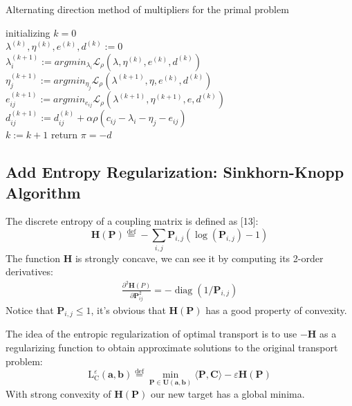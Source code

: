\documentclass{article}
\begin{document}
\begin{large}
\begin{algorithm}[H]
  \SetAlgoNoLine
  \caption{Alternating direction method of multipliers for the primal problem} 
  initializing $k = 0$\\
  $\lambda^{(k)},\eta^{(k)},e^{(k)},d^{(k)}:=0$\\
  {  
   $\lambda^{(k+1)}_{i}:=argmin_{\lambda_{i}}\mathcal{L}_{\rho}(\lambda,\eta^{(k)},e^{(k)},d^{(k)})$\\
   $\eta^{(k+1)}_{j}:=argmin_{\eta_{j}}\mathcal{L}_{\rho}(\lambda^{(k+1)},\eta,e^{(k)},d^{(k)})$\\
   $e^{(k+1)}_{ij}:=argmin_{e_{ij}}\mathcal{L}_{\rho}(\lambda^{(k+1)},\eta^{(k+1)},e,d^{(k)})$\\
   $d^{(k+1)}_{ij}:=d^{(k)}_{ij}+\alpha\rho(c_{ij}-\lambda_{i}-\eta_{j}-e_{ij})$\\
   $k:= k+1$
  }
  return $\pi=-d$
\end{algorithm}
\subsection{Add Entropy Regularization: Sinkhorn-Knopp Algorithm}
The discrete entropy of a coupling matrix is defined as [13]:
\begin{equation}
\mathbf { H } ( \mathbf { P } ) \stackrel { \mathrm { def } } { = } - \sum _ { i , j } \mathbf { P } _ { i , j } \left( \log \left( \mathbf { P } _ { i , j } \right) - 1 \right)
\end{equation}
The function $\mathbf{H}$ is strongly concave, we can see it by computing its 2-order derivatives:
\begin{align}
\frac{\partial ^ { 2 } \mathbf { H } ( P )}{\partial \mathbf{P}_{ij}^2} = - \operatorname { diag } \left( 1 / \mathbf { P } _ { i , j } \right)  
\end{align}
Notice that $\mathbf { P } _ { i , j } \leq 1$, it's obvious that $\mathbf { H } ( \mathbf { P } ) $ has a good property of convexity.

The idea of the entropic regularization of optimal transport is to use $-\mathbf{H}$ as a regularizing function to obtain approximate solutions to the original transport problem:
\begin{equation}
\mathrm { L } _ { \mathrm { C } } ^ { \varepsilon } ( \mathbf { a } , \mathbf { b } ) \stackrel { \mathrm { def } } { = } \min _ { \mathbf { P } \in \mathbf { U } ( \mathbf { a } , \mathbf { b } ) } \langle \mathbf { P } , \mathbf { C } \rangle - \varepsilon \mathbf { H } ( \mathbf { P } )
\label{sinkhorn target}
\end{equation}
With strong convexity of $\mathbf { H  ( P )}$ our new target has a global minima.


\end{large}
\end{document}
